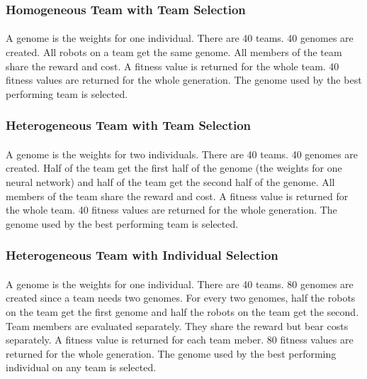 \documentclass[sigconf]{aamas}  %
\begin{document}
\subsubsection{Homogeneous Team with Team Selection}

\paragraph{}
A genome is the weights for one individual. There are 40 teams. 40 genomes are created. All robots on a team get the same genome. All members of the team share the reward and cost. A fitness value is returned for the whole team. 40 fitness values are returned for the whole generation. The genome used by the best performing team is selected.

\subsubsection{Heterogeneous Team with Team Selection}

\paragraph{}
A genome is the weights for two individuals. There are 40 teams. 40 genomes are created. Half of the team get the first half of the genome (the weights for one neural network) and half of the team get the second half of the genome. All members of the team share the reward and cost. A fitness value is returned for the whole team. 40 fitness values are returned for the whole generation. The genome used by the best performing team is selected.

\subsubsection{Heterogeneous Team with Individual Selection}

\paragraph{}
A genome is the weights for one individual. There are 40 teams. 80 genomes are created since a team needs two genomes. For every two genomes, half the robots on the team get the first genome and half the robots on the team get the second. Team members are evaluated separately. They share the reward but bear costs separately. A fitness value is returned for each team meber. 80 fitness values are returned for the whole generation. The genome used by the best performing individual on any team is selected. 
\end{document}
